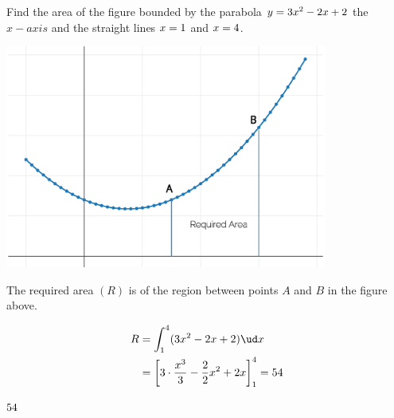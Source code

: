 


\question[2] Find the area of the figure bounded by the parabola $y=3 x^2 - 2 x + 2$
the $x-axis$ and the straight lines $x=1$ and $x=4$.


\ifprintanswers
	\vspace{0.4cm}
	\includegraphics[width=300pt]{plotly.eps}
\fi

\begin{solution}[\halfpage]
	The required area $(R)$ is of the region between points $A$ and $B$ in the figure above.  

  \begin{align}
    R &= \int_{\vd}^{\ve} (\va x^2-\vb x+\vc)\ud x \\
      &= \left[ \va\cdot\dfrac{x^3}{3}-\dfrac{\vb}{2}x^2+\vc x\right]_{\vd}^{\ve} = \vf
  \end{align}
\end{solution}

\ifprintanswers
  \begin{codex}
    $54$ 
  \end{codex}
\fi
